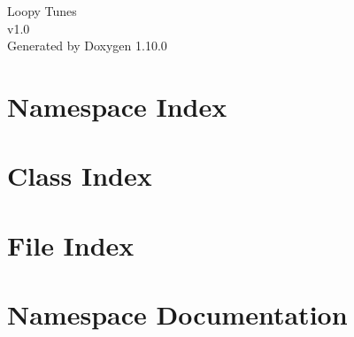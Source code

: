 \documentclass[twoside]{book}
\newcommand{\+}{\discretionary{\mbox{\scriptsize$\hookleftarrow$}}{}{}}
\newcommand{\clearemptydoublepage}{%
    \newpage{\pagestyle{empty}\cleardoublepage}%
  }
\begin{document}
  \raggedbottom
    \hypersetup{pageanchor=false,
                bookmarksnumbered=true,
                pdfencoding=unicode
               }
  \begin{titlepage}
  \vspace*{7cm}
  \begin{center}%
  {\Large Loopy Tunes}\\
  [1ex]\large v1.\+0 \\
  \vspace*{1cm}
  {\large Generated by Doxygen 1.10.0}\\
  \end{center}
  \end{titlepage}
  \clearemptydoublepage
  \tableofcontents
  \clearemptydoublepage
  \hypersetup{pageanchor=true}

\chapter{Namespace Index}

\chapter{Class Index}

\chapter{File Index}

\chapter{Namespace Documentation}












\end{document}
